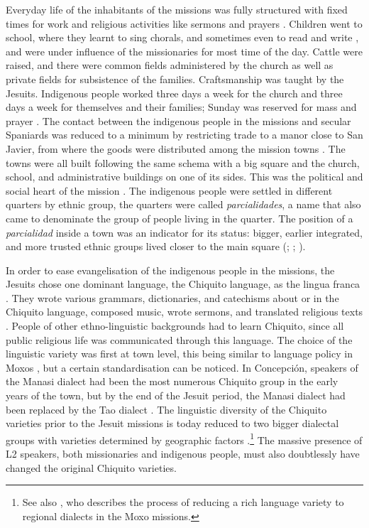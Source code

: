 Everyday life of the inhabitants of the missions was fully structured with fixed times for work and religious activities like sermons and prayers \citep[509--510]{TomichaCharupa2002}. Children went to school, where they learnt to sing chorals, and sometimes even to read and write \citep[508]{TomichaCharupa2002}, and were under influence of the missionaries for most time of the day. Cattle were raised, and there were common fields administered by the church as well as private fields for subsistence of the families. Craftsmanship was taught by the Jesuits. Indigenous people worked three days a week for the church and three days a week for themselves and their families; Sunday was reserved for mass and prayer \citep[82--83]{Tonelli2004}. The contact between the indigenous people in the missions and secular Spaniards was reduced to a minimum by restricting trade to a manor close to San Javier, from where the goods were distributed among the mission towns \citep[80]{Tonelli2004}.
The towns were all built following the same schema with a big square and the church, school, and administrative buildings on one of its sides. This was the political and social heart of the mission \citep[81]{Tonelli2004}. The indigenous people were settled in different quarters by ethnic group, the quarters were called \textit{parcialidades}, a name that also came to denominate the group of people living in the quarter. The position of a \textit{parcialidad} inside a town was an indicator for its status: bigger, earlier integrated, and more trusted ethnic groups lived closer to the main square
(\citealt[49]{APCOB_Saberes}; \citealt[256]{TomichaCharupa2002}; \citealt[425]{MatienzoAL2011}).


In order to ease evangelisation of the indigenous people in the missions, the Jesuits chose one dominant language, the Chiquito language, as the lingua franca \citep[425]{MatienzoAL2011}. They wrote various grammars, dictionaries, and catechisms about or in the Chiquito language, composed music, wrote sermons, and translated religious texts \citep[235--238]{TomichaCharupa2002}. People of other ethno-linguistic backgrounds had to learn Chiquito, since all public religious life was communicated through this language. The choice of the linguistic variety was first at town level, this being similar to language policy in Moxos \citep[cf.][357]{Saito2009}, but a certain standardisation can be noticed. In Concepción, speakers of the Manasi dialect had been the most numerous Chiquito group in the early years of the town, but by the end of the Jesuit period, the Manasi dialect had been replaced by the Tao dialect \citep[256]{TomichaCharupa2002}. The linguistic diversity of the Chiquito varieties prior to the Jesuit missions is today reduced to two bigger dialectal groups with varieties determined by geographic factors \citep[cf.][268]{Galeote2014}.\footnote{See also \citet[]{Saito2009}, who describes the process of reducing a rich language variety to regional dialects in the Moxo missions.}
The massive presence of L2 speakers, both missionaries and indigenous people, must also doubtlessly have changed the original Chiquito varieties.

